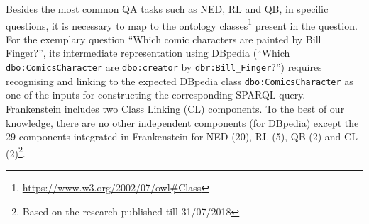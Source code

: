 \documentclass[sigconf,edbt]{acmart-edbt2019}
\newcommand{\qq}[1]{``#1''}
\newcommand{\jlt}[1]{\todo[inline, color=cyan]{JL: #1}}
\begin{document}
Besides the most common QA tasks such as NED, RL and QB, in specific questions, it is necessary to map to the ontology classes\footnote{\url{https://www.w3.org/2002/07/owl\#Class}} present in the question. For the exemplary question \qq{Which comic characters are painted by Bill Finger?}, its intermediate representation using DBpedia (\qq{Which \texttt{dbo:ComicsCharacter} are \texttt{dbo:creator} by \texttt{dbr:Bill\_Finger}?}) requires recognising and linking to the expected DBpedia class \texttt{dbo:ComicsCharacter} as one of the inputs for constructing the corresponding SPARQL query. Frankenstein includes two Class Linking (CL) components. To the best of our knowledge, there are no other independent components (for DBpedia) except the 29 components integrated in Frankenstein for NED (20), RL (5), QB (2) and CL (2)\footnote{Based on the research published till 31/07/2018}.

\end{document}

